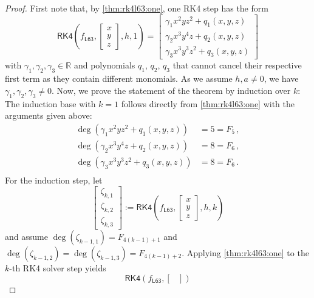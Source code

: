 \documentclass[10pt,a4paper]{amsart}
\newcommand{\R}{\mathbb{R}}
\newcommand{\br}[1]{\lb #1 \rb} %
\newcommand{\brOf}[1]{\!\br{#1}} %
\newcommand{\eqcm}{\,,} %
\newcommand{\eqfs}{\,.}
\newcommand{\lb}{\left(} %
\newcommand{\rb}{\right)} %
\begin{document}
\begin{proof}
	First note that, by \cref{thm:rk4l63:one}, one RK4 step has the form
	\begin{equation*}
		\mathsf{RK4}\brOf{f_{\mathsf{L63}}, \begin{bmatrix}
				x\\
				y\\
				z
			\end{bmatrix}, h, 1} = 
		\begin{bmatrix}
			\gamma_1 x^2 y z^2 + q_1(x,y,z)\\
			\gamma_2 x^3 y^4 z + q_2(x,y,z)\\
			\gamma_3 x^3 y^3 z^2 + q_3(x,y,z)
		\end{bmatrix}
	\end{equation*}
	with $\gamma_1,\gamma_2, \gamma_3 \in\R$ and polynomials $q_1$, $q_2$, $q_3$ that cannot cancel their respective first term as they contain different monomials. As we assume $h,a\neq 0$, we have $\gamma_1,\gamma_2, \gamma_3\neq0$.
	Now, we prove the statement of the theorem by induction over $k$:
	The induction base with $k=1$ follows directly from \cref{thm:rk4l63:one} with the arguments given above:
	\begin{align*}
		\deg(\gamma_1 x^2 y   z^2 + q_1(x,y,z))  &= 5 = F_{5}\eqcm\\
		\deg(\gamma_2 x^3 y^4 z   + q_2(x,y,z))  &= 8 = F_{6}\eqcm\\
		\deg(\gamma_3 x^3 y^3 z^2 + q_3(x,y,z))  &= 8 = F_{6}\eqfs\\
	\end{align*} 
	For the induction step, let
	\begin{equation*}
		\begin{bmatrix}
			\zeta_{k,1}\\
			\zeta_{k,2}\\
			\zeta_{k,3}
		\end{bmatrix}
		:=
		\mathsf{RK4}\brOf{f_{\mathsf{L63}}, \begin{bmatrix}
				x\\
				y\\
				z
			\end{bmatrix}, h, k}
	\end{equation*}
	and assume $\deg(\zeta_{k-1,1}) = F_{4(k-1)+1}$ and $\deg(\zeta_{k-1,2}) = \deg(\zeta_{k-1,3}) = F_{4(k-1)+2}$.
	Applying \cref{thm:rk4l63:one} to the $k$-th RK4 solver step yields
	\begin{equation*}
		\mathsf{RK4}\brOf{f_{\mathsf{L63}}, \begin{bmatrix}

\end{bmatrix}}
\end{equation*}
\end{proof}
\end{document}
